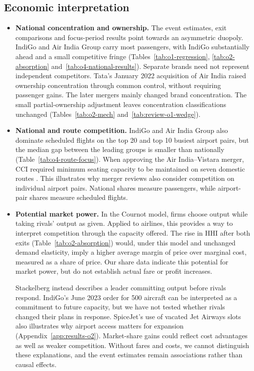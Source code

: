 \subsection{Economic interpretation}
\label{sec:review-economic-interpretation}
\begin{itemize}[itemsep=0pt,parsep=0pt,topsep=4pt]
\item \textbf{National concentration and ownership.} The event estimates, exit comparisons and focus-period results point towards an asymmetric duopoly. IndiGo and Air India Group carry most passengers, with IndiGo substantially ahead and a small competitive fringe (Tables~\ref{tab:o1-regression}, \ref{tab:o2-absorption} and~\ref{tab:o4-national-results}). Separate brands need not represent independent competitors. Tata's January 2022 acquisition of Air India raised ownership concentration through common control, without requiring passenger gains. The later mergers mainly changed brand concentration. The small partial-ownership adjustment leaves concentration classifications unchanged (Tables~\ref{tab:o2-mech} and~\ref{tab:review-o1-wedge}).

\item \textbf{National and route competition.} IndiGo and Air India Group also dominate scheduled flights on the top 20 and top 10 busiest airport pairs, but the median gap between the leading groups is smaller than nationally (Table~\ref{tab:o4-route-focus}). When approving the Air India--Vistara merger, CCI required minimum seating capacity to be maintained on seven domestic routes \parencite{cci2023vistara}. This illustrates why merger reviews also consider competition on individual airport pairs. National shares measure passengers, while airport-pair shares measure scheduled flights.

\item \textbf{Potential market power.} In the Cournot model, firms choose output while taking rivals' output as given. Applied to airlines, this provides a way to interpret competition through the capacity offered. The rise in HHI after both exits (Table~\ref{tab:o2-absorption}) would, under this model and unchanged demand elasticity, imply a higher average margin of price over marginal cost, measured as a share of price. Our share data indicate this potential for market power, but do not establish actual fare or profit increases.

Stackelberg instead describes a leader committing output before rivals respond. IndiGo's June 2023 order for 500 aircraft can be interpreted as a commitment to future capacity, but we have not tested whether rivals changed their plans in response. SpiceJet's use of vacated Jet Airways slots also illustrates why airport access matters for expansion (Appendix~\ref{app:results-o2}). Market-share gains could reflect cost advantages as well as weaker competition. Without fares and costs, we cannot distinguish these explanations, and the event estimates remain associations rather than causal effects.


\end{itemize}
